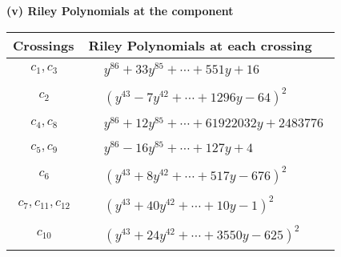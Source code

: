 \documentclass[1p]{elsarticle_modified}
\theoremstyle{definition}
\begin{document}
\flushleft \textbf{(v) Riley Polynomials at the component}\newline \\
\begin{tabular}{m{50pt}|m{274pt}}
Crossings & \hspace{64pt}Riley Polynomials at each crossing \\
\hline $$\begin{aligned}c_{1},c_{3}\end{aligned}$$&$\begin{aligned}
&y^{86}+33 y^{85}+\cdots+551 y+16
\end{aligned}$\\
\hline $$\begin{aligned}c_{2}\end{aligned}$$&$\begin{aligned}
&(y^{43}-7 y^{42}+\cdots+1296 y-64)^{2}
\end{aligned}$\\
\hline $$\begin{aligned}c_{4},c_{8}\end{aligned}$$&$\begin{aligned}
&y^{86}+12 y^{85}+\cdots+61922032 y+2483776
\end{aligned}$\\
\hline $$\begin{aligned}c_{5},c_{9}\end{aligned}$$&$\begin{aligned}
&y^{86}-16 y^{85}+\cdots+127 y+4
\end{aligned}$\\
\hline $$\begin{aligned}c_{6}\end{aligned}$$&$\begin{aligned}
&(y^{43}+8 y^{42}+\cdots+517 y-676)^{2}
\end{aligned}$\\
\hline $$\begin{aligned}c_{7},c_{11},c_{12}\end{aligned}$$&$\begin{aligned}
&(y^{43}+40 y^{42}+\cdots+10 y-1)^{2}
\end{aligned}$\\
\hline $$\begin{aligned}c_{10}\end{aligned}$$&$\begin{aligned}
&(y^{43}+24 y^{42}+\cdots+3550 y-625)^{2}
\end{aligned}$\\
\hline
\end{tabular}\\~\\
\end{document}
